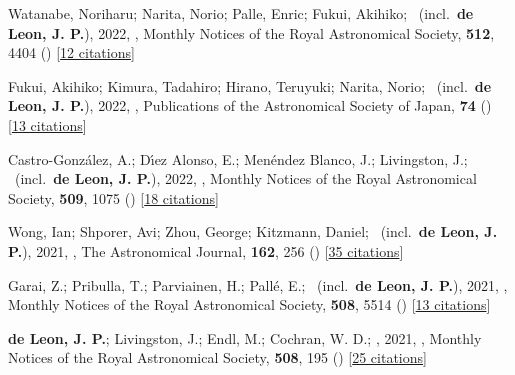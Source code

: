 \item[{\color{numcolor}\scriptsize44}] Watanabe, Noriharu; Narita, Norio; Palle, Enric; Fukui, Akihiko; \etal\ (incl.\ \textbf{de Leon, J. P.}), 2022, , Monthly Notices of the Royal Astronomical Society, \textbf{512}, 4404 () [\href{https://ui.adsabs.harvard.edu/abs/2022MNRAS.512.4404W}{12 citations}]

\item[{\color{numcolor}\scriptsize43}] Fukui, Akihiko; Kimura, Tadahiro; Hirano, Teruyuki; Narita, Norio; \etal\ (incl.\ \textbf{de Leon, J. P.}), 2022, , Publications of the Astronomical Society of Japan, \textbf{74} () [\href{https://ui.adsabs.harvard.edu/abs/2022PASJ...74L...1F}{13 citations}]

\item[{\color{numcolor}\scriptsize42}] Castro-Gonz{\'a}lez, A.; D{\'\i}ez Alonso, E.; Men{\'e}ndez Blanco, J.; Livingston, J.; \etal\ (incl.\ \textbf{de Leon, J. P.}), 2022, , Monthly Notices of the Royal Astronomical Society, \textbf{509}, 1075 () [\href{https://ui.adsabs.harvard.edu/abs/2022MNRAS.509.1075C}{18 citations}]

\item[{\color{numcolor}\scriptsize41}] Wong, Ian; Shporer, Avi; Zhou, George; Kitzmann, Daniel; \etal\ (incl.\ \textbf{de Leon, J. P.}), 2021, , The Astronomical Journal, \textbf{162}, 256 () [\href{https://ui.adsabs.harvard.edu/abs/2021AJ....162..256W}{35 citations}]

\item[{\color{numcolor}\scriptsize40}] Garai, Z.; Pribulla, T.; Parviainen, H.; Pall{\'e}, E.; \etal\ (incl.\ \textbf{de Leon, J. P.}), 2021, , Monthly Notices of the Royal Astronomical Society, \textbf{508}, 5514 () [\href{https://ui.adsabs.harvard.edu/abs/2021MNRAS.508.5514G}{13 citations}]

\item[{\color{numcolor}\scriptsize39}] \textbf{de Leon, J. P.}; Livingston, J.; Endl, M.; Cochran, W. D.; \etal, 2021, , Monthly Notices of the Royal Astronomical Society, \textbf{508}, 195 () [\href{https://ui.adsabs.harvard.edu/abs/2021MNRAS.508..195D}{25 citations}]

